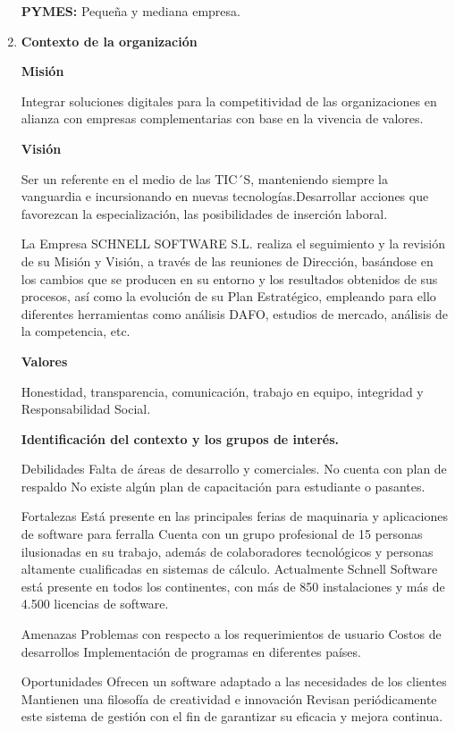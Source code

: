 \documentclass[10pt,a4paper]{article}
\begin{document}
\begin{enumerate}
\textbf{PYMES: }Pequeña y mediana empresa.

\item \textbf{Contexto de la organización}

\textbf{Misión}

Integrar soluciones digitales para la competitividad de las organizaciones en alianza con empresas complementarias con base en la vivencia de valores.

\textbf{Visión}

Ser un referente en el medio de las TIC´S, manteniendo siempre la vanguardia e incursionando en nuevas tecnologías.Desarrollar acciones que favorezcan la especialización, las posibilidades de inserción laboral.

La Empresa SCHNELL SOFTWARE S.L. realiza el seguimiento y la revisión de su Misión y Visión, a través de las reuniones de
Dirección, basándose en los cambios que se producen en su entorno y los resultados obtenidos de sus procesos, así como la evolución de su Plan Estratégico, empleando para ello diferentes herramientas como análisis DAFO, estudios de mercado, análisis de la competencia, etc.

\textbf{Valores}

Honestidad, transparencia, comunicación, trabajo en equipo, integridad y Responsabilidad Social.

\textbf{Identificación del contexto y los grupos de interés.}



Debilidades
Falta de áreas de desarrollo y comerciales.
No cuenta con plan de respaldo
No existe algún plan de capacitación para estudiante o pasantes.

Fortalezas
Está presente en las principales ferias de maquinaria y aplicaciones de software para ferralla
Cuenta con un grupo profesional de 15 personas ilusionadas en su trabajo, además de colaboradores tecnológicos y personas altamente cualificadas en sistemas de cálculo.
Actualmente Schnell Software está presente en todos los continentes, con más de 850 instalaciones y más de 4.500 licencias de software.

Amenazas
Problemas con respecto a los requerimientos de usuario
Costos de desarrollos 
Implementación de programas en diferentes países.

Oportunidades
Ofrecen un software adaptado a las necesidades de los clientes
Mantienen una filosofía de creatividad e innovación 
Revisan periódicamente este sistema de gestión con el fin de garantizar su eficacia y mejora continua.



\end{enumerate}
\end{document}
